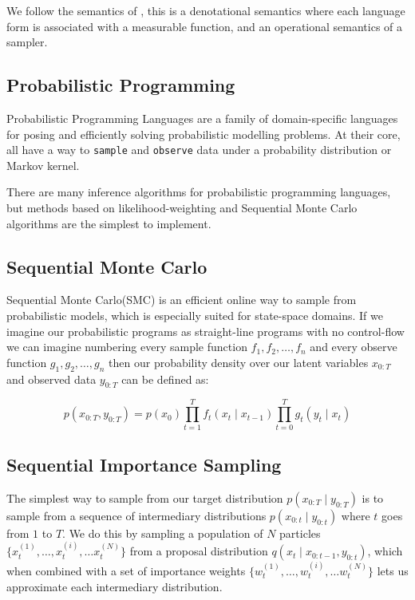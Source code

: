 \documentclass[
]{ceurart}
\begin{document}
We follow the semantics of \cite{staton2016semantics}, this is a
denotational semantics where each language form is associated with a
measurable function, and an operational semantics of a sampler.

\subsection{Probabilistic Programming}

Probabilistic Programming Languages\cite{wood2014new,
  van2018introduction} are a family of domain-specific languages for
posing and efficiently solving probabilistic modelling problems. At
their core, all have a way to \texttt{sample} and \texttt{observe}
data under a probability distribution or Markov kernel.

There are many inference algorithms for probabilistic programming
languages, but methods based on likelihood-weighting and Sequential
Monte Carlo algorithms are the simplest to implement.

\subsection{Sequential Monte Carlo}

Sequential Monte Carlo\cite{chopin2020introduction}(SMC) is an efficient
online way to sample from probabilistic models, which is especially suited for
state-space domains. If we imagine our probabilistic programs as
straight-line programs with no control-flow we can imagine numbering
every sample function $f_1, f_2, \ldots, f_n$ and every observe
function $g_1, g_2, \ldots, g_n$ then our probability density over our
latent variables $x_{0:T}$ and observed data $y_{0:T}$ can be defined as:

\begin{equation}
  p(x_{0:T}, y_{0:T}) = p(x_0)\prod_{t=1}^T f_t(x_t \mid x_{t-1})\prod_{t=0}^T g_t(y_t \mid x_t)
\end{equation}

\subsection{Sequential Importance Sampling}

The simplest way to sample from our target distribution $p(x_{0:T}
\mid y_{0:T})$ is to sample from a sequence of intermediary
distributions $p(x_{0:t} \mid y_{0:t})$ where $t$ goes from $1$ to
$T$. We do this by sampling a population of $N$ particles
$\{x^{(1)}_t, \ldots, x^{(i)}_t, \ldots x^{(N)}_t\}$ from a proposal
distribution $q(x_t \mid x_{0:t-1}, y_{0:t})$, which when combined
with a set of importance weights $\{w^{(1)}_t, \ldots, w^{(i)}_t,
\ldots w^{(N)}_t\}$ lets us approximate each intermediary
distribution.
\end{document}
